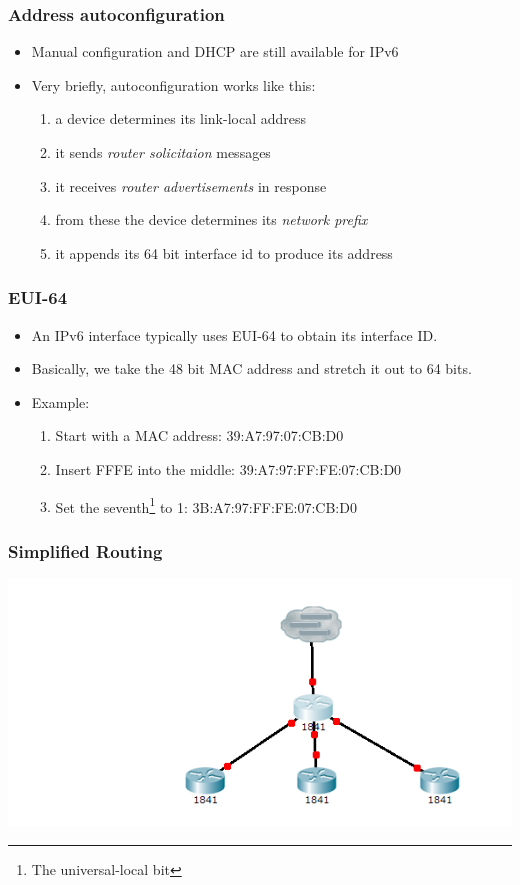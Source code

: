 \documentclass[10pt]{beamer}
\begin{document}
\begin{frame}
  \frametitle{Address autoconfiguration}

 \begin{itemize}
  \item Manual configuration and DHCP are still available for IPv6
  \item Very briefly, autoconfiguration works like this:
      \begin{enumerate}
        \item a device determines its link-local address
        \item it sends \emph{router solicitaion} messages
        \item it receives \emph{router advertisements} in response
        \item from these the device determines its \emph{network prefix}
        \item it appends its 64 bit interface id to produce its address
      \end{enumerate}
 \end{itemize}

\end{frame}



\begin{frame}
  \frametitle{EUI-64}

 \begin{itemize}
  \item An IPv6 interface typically uses EUI-64 to obtain its interface ID.
  \item Basically, we take the 48 bit MAC address and stretch it out to 64 bits.
  \item Example:
     \begin{enumerate}
       \item Start with a MAC address:  39:A7:97:07:CB:D0
       \item Insert FFFE into the middle:  39:A7:97:FF:FE:07:CB:D0
       \item Set the seventh\footnote{The universal-local bit} to 1:  3B:A7:97:FF:FE:07:CB:D0
     \end{enumerate}
 \end{itemize}

\end{frame}



\begin{frame}
  \frametitle{Simplified Routing}
   \includegraphics[scale=0.5]{nw.png}

\end{frame}
\end{document}
